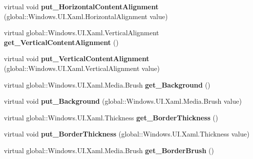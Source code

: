 \begin{DoxyCompactItemize}
virtual void {\bfseries put\+\_\+\+Horizontal\+Content\+Alignment} (global\+::\+Windows.\+U\+I.\+Xaml.\+Horizontal\+Alignment value)
\item 
\mbox{\label{class_windows_1_1_u_i_1_1_xaml_1_1_controls_1_1_control_a7006e185e4500ff498f82b3f44fd79fa}} 
virtual global\+::\+Windows.\+U\+I.\+Xaml.\+Vertical\+Alignment {\bfseries get\+\_\+\+Vertical\+Content\+Alignment} ()
\item 
\mbox{\label{class_windows_1_1_u_i_1_1_xaml_1_1_controls_1_1_control_af756ef0a995189ff771e3537a5391b42}} 
virtual void {\bfseries put\+\_\+\+Vertical\+Content\+Alignment} (global\+::\+Windows.\+U\+I.\+Xaml.\+Vertical\+Alignment value)
\item 
\mbox{\label{class_windows_1_1_u_i_1_1_xaml_1_1_controls_1_1_control_a5eb22428eb30c926bcbbdcce65e09678}} 
virtual global\+::\+Windows.\+U\+I.\+Xaml.\+Media.\+Brush {\bfseries get\+\_\+\+Background} ()
\item 
\mbox{\label{class_windows_1_1_u_i_1_1_xaml_1_1_controls_1_1_control_abc00b1110cfb2ca8076ac8356a548d78}} 
virtual void {\bfseries put\+\_\+\+Background} (global\+::\+Windows.\+U\+I.\+Xaml.\+Media.\+Brush value)
\item 
\mbox{\label{class_windows_1_1_u_i_1_1_xaml_1_1_controls_1_1_control_ab76eb28c6756bacca0cc41591940408d}} 
virtual global\+::\+Windows.\+U\+I.\+Xaml.\+Thickness {\bfseries get\+\_\+\+Border\+Thickness} ()
\item 
\mbox{\label{class_windows_1_1_u_i_1_1_xaml_1_1_controls_1_1_control_a4a02a62301b0458bfefc9d7c25b6511e}} 
virtual void {\bfseries put\+\_\+\+Border\+Thickness} (global\+::\+Windows.\+U\+I.\+Xaml.\+Thickness value)
\item 
\mbox{\label{class_windows_1_1_u_i_1_1_xaml_1_1_controls_1_1_control_a71ff5e84affd65e6419e6e3f9a2292b9}} 
virtual global\+::\+Windows.\+U\+I.\+Xaml.\+Media.\+Brush {\bfseries get\+\_\+\+Border\+Brush} ()

\end{DoxyCompactItemize}
